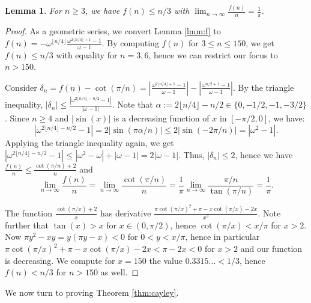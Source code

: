 \documentclass[12pt]{article}
\newcommand{\floor}[1]{\lfloor{#1\rfloor}}
\newtheorem{lmm}[thm]{Lemma}
\begin{document}
\begin{lmm}\label{lmm:f-growth}
    For $n \ge 3$, we have $f(n) \le n/3$ with $\lim_{n \to \infty} \frac{f(n)}{n} = \frac{1}{\pi}$.
\end{lmm}
\begin{proof}
    As a geometric series, we convert Lemma \ref{lmm:f} to $f(n) = -\omega^{\floor{n/4}} \frac{\omega^{2\floor{n/4}+1}-1}{\omega - 1}$. By computing $f(n)$ for $3 \le n \le 150$, we get $f(n) \le n/3$ with equality for $n = 3, 6$, hence we can restrict our focus to $n > 150$. 

    Consider $\delta_n = f(n) - \cot(\pi/n) = |\frac{\omega^{2\floor{n/4}+1}-1}{\omega - 1}| - |\frac{\omega^{n/2+1}-1}{\omega-1}|$. By the triangle inequality, $|\delta_n| \le \frac{|\omega^{2\floor{n/4}-n/2}-1|}{|\omega-1|}$. Note that $\alpha := 2\floor{n/4} - n/2 \in \{0, -1/2, -1, -3/2\}$. Since $n \ge 4$ and $|\sin(x)|$ is a decreasing function of $x$ in $[-\pi/2, 0]$, we have:
    \[|\omega^{2\floor{n/4}-n/2} - 1| = 2|\sin(\pi \alpha /n)| \le 2|\sin(-2\pi/n)| = |\omega^2-1|.\]
    Applying the triangle inequality again, we get $|\omega^{2\floor{n/4}-n/2} - 1| \le |\omega^2 - \omega| + |\omega - 1| = 2|\omega - 1|$. Thus, $|\delta_n| \le 2$, hence we have $\frac{f(n)}{n} \le \frac{\cot(\pi/n)+2}{n}$ and
    \[\lim_{n \to \infty} \frac{f(n)}{n} = \lim_{n \to \infty} \frac{\cot(\pi/n)}{n} = \frac{1}{\pi} \lim_{n \to \infty} \frac{\pi/n}{\tan(\pi/n)} = \frac1{\pi}.\]

    The function $\frac{\cot(\pi/x)+2}{x}$ has derivative $\frac{\pi \cot(\pi/x)^2 + \pi - x\cot(\pi/x) - 2x}{x^3}$. Note further that $\tan(x) > x$ for $x \in (0, \pi/2)$, hence $\cot(\pi/x) < x/\pi$ for $x > 2$. Now $\pi y^2 - xy = y(\pi y - x) < 0$ for $0 < y < x/\pi$, hence in particular $\pi \cot(\pi/x)^2 + \pi - x\cot(\pi/x) - 2x < \pi - 2x < 0$ for $x > 2$ and our function is decreasing. We compute for $x = 150$ the value $0.3315... < 1/3$, hence $f(n) < n/3$ for $n > 150$ as well. 
\end{proof}

We now turn to proving Theorem \ref{thm:cayley}. 
\end{document}
